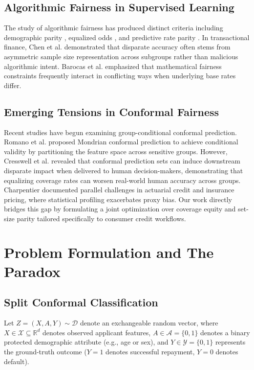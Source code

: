 \documentclass[conference]{IEEEtran}
\begin{document}
\subsection{Algorithmic Fairness in Supervised Learning}
The study of algorithmic fairness has produced distinct criteria including demographic parity \cite{dwork2012fairness}, equalized odds \cite{hardt2016equality}, and predictive rate parity \cite{corbett2018measure}. In transactional finance, Chen et al. \cite{chen2018why} demonstrated that disparate accuracy often stems from asymmetric sample size representation across subgroups rather than malicious algorithmic intent. Barocas et al. \cite{barocas2023fairness} emphasized that mathematical fairness constraints frequently interact in conflicting ways when underlying base rates differ.

\subsection{Emerging Tensions in Conformal Fairness}
Recent studies have begun examining group-conditional conformal prediction. Romano et al. \cite{romano2020classification} proposed Mondrian conformal prediction to achieve conditional validity by partitioning the feature space across sensitive groups. However, Cresswell et al. \cite{cresswell2025conformal} revealed that conformal prediction sets can induce downstream disparate impact when delivered to human decision-makers, demonstrating that equalizing coverage rates can worsen real-world human accuracy across groups. Charpentier \cite{charpentier2024insurance} documented parallel challenges in actuarial credit and insurance pricing, where statistical profiling exacerbates proxy bias. Our work directly bridges this gap by formulating a joint optimization over coverage equity and set-size parity tailored specifically to consumer credit workflows.

\section{Problem Formulation and The Paradox}
\label{sec:paradox}

\subsection{Split Conformal Classification}
Let $Z = (X, A, Y) \sim \mathcal{D}$ denote an exchangeable random vector, where $X \in \mathcal{X} \subseteq \mathbb{R}^d$ denotes observed applicant features, $A \in \mathcal{A} = \{0, 1\}$ denotes a binary protected demographic attribute (e.g., age or sex), and $Y \in \mathcal{Y} = \{0, 1\}$ represents the ground-truth outcome ($Y = 1$ denotes successful repayment, $Y = 0$ denotes default).
\end{document}
